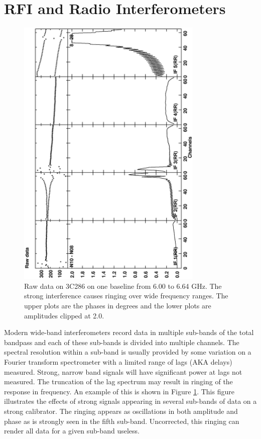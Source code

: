 \documentclass[journal]{IEEEtran}
\begin{document}
\section{RFI and Radio Interferometers}
\begin{figure}
\includegraphics[angle=-90,width=3.5in]{figs/noHann.eps}
\caption{ 
Raw data on 3C286 on one baseline from 6.00 to 6.64 GHz.
The strong interference causes ringing over wide frequency ranges.
The upper plots are the phases in degrees and the lower plots are
amplitudes clipped at 2.0.
} 
\label{RawFig}
\end{figure}

Modern wide-band interferometers record data in multiple sub-bands of
the total bandpass and each of these sub-bands is divided into multiple
channels.
The spectral resolution within a sub-band is usually provided by some
variation on a Fourier transform spectrometer with a limited range of
lags (AKA delays) measured.
Strong, narrow band signals will have significant power at lags not
measured.
The truncation of the lag spectrum may result in ringing of the
response in frequency.
An example of this is shown in Figure \ref{RawFig}.
This figure illustrates the effects of strong signals appearing in
several sub-bands of data on a strong calibrator.
The ringing appears as oscillations in both amplitude and phase as is
strongly seen in the fifth sub-band.
Uncorrected, this ringing can render all data for a given sub-band
useless.
\end{document}
